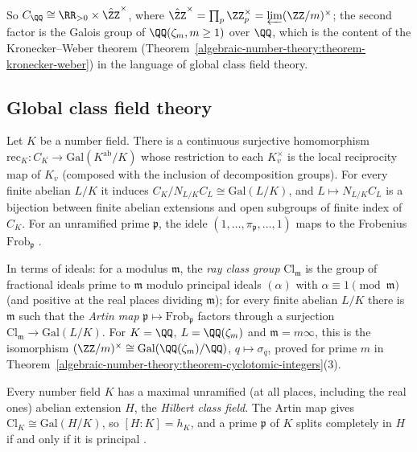 So $C_\QQ \cong \RR_{>0} \times \hat{\ZZ}^\times$, where $\hat{\ZZ}^\times = \prod_p\ZZ_p^\times = \varprojlim(\ZZ/m)^\times$; the second factor is the Galois group of $\QQ(\zeta_m, m \geq 1)$ over $\QQ$, which is the content
of the Kronecker--Weber theorem (Theorem~\ref{algebraic-number-theory:theorem-kronecker-weber}) in the language of global class field theory.

\subsection{Global class field theory}\label{local-fields:subsection-global-cft}

\begin{theorem}\label{local-fields:theorem-global-cft}
Let $K$ be a number field. There is a continuous surjective homomorphism $\mathrm{rec}_K \colon C_K \to \mathrm{Gal}(K^{\mathrm{ab}}/K)$ whose restriction to each $K_v^\times$ is the local reciprocity map of
$K_v$ (composed with the inclusion of decomposition groups). For every finite abelian $L/K$ it induces $C_K/N_{L/K}C_L \cong \mathrm{Gal}(L/K)$, and $L \mapsto N_{L/K}C_L$ is a bijection between finite abelian
extensions and open subgroups of finite index of $C_K$. For an unramified prime $\mathfrak{p}$, the idele $(1, \dots, \pi_\mathfrak{p}, \dots, 1)$ maps to the Frobenius $\mathrm{Frob}_\mathfrak{p}$
\cite[Chapter VI, \S\S 5--6]{neukirch-ant}.
\end{theorem}

In terms of ideals: for a modulus $\mathfrak{m}$, the \emph{ray class group} $\mathrm{Cl}_\mathfrak{m}$ is the group of fractional ideals prime to $\mathfrak{m}$ modulo principal ideals $(\alpha)$ with
$\alpha \equiv 1 \pmod{\mathfrak{m}}$ (and positive at the real places dividing $\mathfrak{m}$); for every finite abelian $L/K$ there is $\mathfrak{m}$ such that the \emph{Artin map}
$\mathfrak{p} \mapsto \mathrm{Frob}_\mathfrak{p}$ factors through a surjection $\mathrm{Cl}_\mathfrak{m} \to \mathrm{Gal}(L/K)$. For $K = \QQ$, $L = \QQ(\zeta_m)$ and $\mathfrak{m} = m\infty$, this is the isomorphism
$(\ZZ/m)^\times \cong \mathrm{Gal}(\QQ(\zeta_m)/\QQ)$, $q \mapsto \sigma_q$, proved for prime $m$ in Theorem~\ref{algebraic-number-theory:theorem-cyclotomic-integers}(3).

\begin{theorem}\label{local-fields:theorem-hilbert-class-field}
Every number field $K$ has a maximal unramified (at all places, including the real ones) abelian extension $H$, the \emph{Hilbert class field}. The Artin map gives $\mathrm{Cl}_K \cong \mathrm{Gal}(H/K)$, so
$[H : K] = h_K$, and a prime $\mathfrak{p}$ of $K$ splits completely in $H$ if and only if it is principal \cite[Chapter VI, \S 6]{neukirch-ant}.
\end{theorem}

